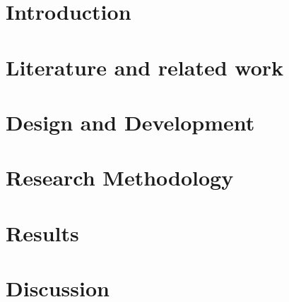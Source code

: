 \documentclass[12pt,a4paper]{book}
\newcommand{\blankpage}[0]{
	\newpage
	\thispagestyle{plain}
	\mbox{}
}
\begin{document}
\hypersetup{pageanchor=false}

\blankpage	
\cleardoublepage
\frontmatter



\tableofcontents
\listoftables
\listoffigures
\hypersetup{pageanchor=true}

\mainmatter
\chapter{Introduction}\label{part:introduction}


%

\chapter{Literature and related work}\label{part:literature}


\chapter{Design and Development}\label{part:development}


\chapter{Research Methodology}\label{part:method}


\chapter{Results}\label{part:results}


\chapter{Discussion}\label{part:discussion}


\end{document}
